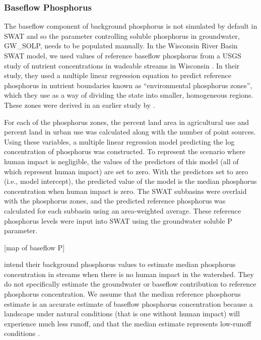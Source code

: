 \subsubsection{Baseflow Phosphorus}\label{sec:gwp}
	The baseflow component of background phosphorus is not simulated by default in SWAT and so the parameter controlling soluble phosphorus in groundwater, GW\_SOLP, needs to be populated manually. In the Wisconsin River Basin SWAT model, we used values of reference baseflow phosphorus from a USGS study of nutrient concentrations in wadeable streams in Wisconsin \citet{robertson_wadeable_2006}. In their study, they used a multiple linear regression equation to predict reference phosphorus in nutrient boundaries known as ``environmental phosphorus zones'', which they use as a way of dividing the state into smaller, homogeneous regions. These zones were derived in an earlier study by \citet{robertson_phosphoruszones_2006}.
	
	For each of the phosphorus zones, the percent land area in agricultural use and percent land in urban use was calculated along with the number of point sources. Using these variables, a multiple linear regression model predicting the log concentration of phosphorus was constructed. To represent the scenario where human impact is negligible, the values of the predictors of this model (all of which represent human impact) are set to zero. With the predictors set to zero (i.e., model intercept), the predicted value of the model is the median phosphorus concentration when human impact is zero. The SWAT subbasins were overlaid with the phosphorus zones, and the predicted reference phosphorus was calculated for each subbasin using an area-weighted average. These reference phosphorus levels were input into SWAT using the groundwater soluble P parameter.
	
	[map of baseflow P]
	
	\citet{robertson_wadeable_2006} intend their background phosphorus values to estimate median phosphorus concentration in streams when there is no human impact in the watershed. They do not specifically estimate the groundwater or baseflow contribution to reference phosphorus concentration. We assume that the median reference phosphorus estimate is an accurate estimate of baseflow phosphorus concentration because a landscape under natural conditions (that is one without human impact) will experience much less runoff, and that the median estimate represents low-runoff conditions \citep{nrcs_tr55_1986}.
	
	
	
	